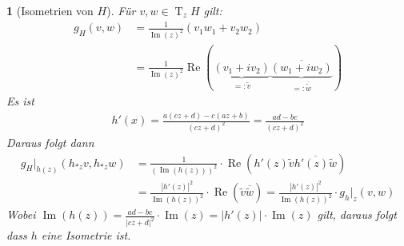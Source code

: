 \documentclass[paper=A4, twoside, chapterprefix=true, bibliography=totoc, headsepline]{scrbook}
\DeclareMathOperator{\T}{T}         %
\renewcommand{\Re}{\ensuremath{\operatorname{Re}}}
\renewcommand{\Im}{\ensuremath{\operatorname{Im}}}
\theoremstyle{plain}
\theoremstyle{nonumberplain}
\theoremstyle{empty}
\newtheorem{emptythm}{}%
\theoremstyle{break}
\begin{document}
\begin{emptythm}[Isometrien von $H$]
F\"ur $v, w \in \T_zH$ gilt:
\begin{align*}
	g_H(v, w) &= \frac{1}{\Im(z)^2} (v_1 w_1 + v_2 w_2) \\
	&= \frac{1}{\Im(z)^2} \Re(\underbrace{(v_1 + iv_2)}_{=: \tilde{v}} \overline{\underbrace{(w_1 + i w_2)}_{=:\overline{\tilde{w}}}})
\end{align*}
Es ist
\begin{align*}
	h'(x) = \frac{a(cz + d) - c(az + b)}{(cz + d)^2} = \frac{ad - bc}{(cz + d)^2}
\end{align*}
Daraus folgt dann
\begin{align*}
	g_H|_{h(z)}(h_{*z}v, h_{*z}w) &= \frac{1}{(\Im(h(z)))^2} \cdot \Re(h'(z) \tilde{v} \overline{h'(z) \tilde{w}}) \\
	&= \frac{|h'(z)|^2}{\Im(h(z))^2} \cdot \Re(\tilde{v} \overline{\tilde{w}}) = \frac{|h'(z)|^2}{\Im(h(z))^2} \cdot g_h|_z(v,w)
\end{align*}
Wobei $\Im(h(z)) = \frac{ad - bc}{|cz + d|^2} \cdot \Im(z) = |h'(z)| \cdot \Im(z)$ gilt, daraus folgt dass $h$ eine Isometrie ist.
\end{emptythm}
\end{document}
